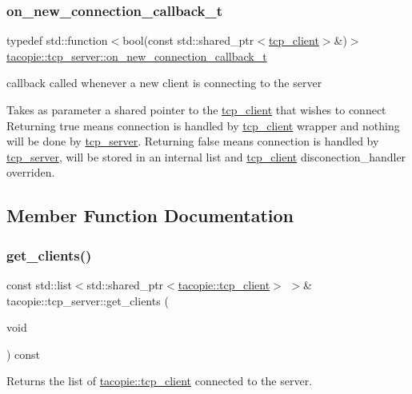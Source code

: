 \subsubsection{\texorpdfstring{on\+\_\+new\+\_\+connection\+\_\+callback\+\_\+t}{on\_new\_connection\_callback\_t}}
{\footnotesize\ttfamily typedef std\+::function$<$bool(const std\+::shared\+\_\+ptr$<$\hyperlink{classtacopie_1_1tcp__client}{tcp\+\_\+client}$>$\&)$>$ \hyperlink{classtacopie_1_1tcp__server_a103cb4e6fcab00f88a708aabd38b66ff}{tacopie\+::tcp\+\_\+server\+::on\+\_\+new\+\_\+connection\+\_\+callback\+\_\+t}}

callback called whenever a new client is connecting to the server

Takes as parameter a shared pointer to the \hyperlink{classtacopie_1_1tcp__client}{tcp\+\_\+client} that wishes to connect Returning true means connection is handled by \hyperlink{classtacopie_1_1tcp__client}{tcp\+\_\+client} wrapper and nothing will be done by \hyperlink{classtacopie_1_1tcp__server}{tcp\+\_\+server}. Returning false means connection is handled by \hyperlink{classtacopie_1_1tcp__server}{tcp\+\_\+server}, will be stored in an internal list and \hyperlink{classtacopie_1_1tcp__client}{tcp\+\_\+client} disconection\+\_\+handler overriden. 

\subsection{Member Function Documentation}
\mbox{\label{classtacopie_1_1tcp__server_a0df81b943243ad51102c37d4944be8d7}} 
\subsubsection{\texorpdfstring{get\+\_\+clients()}{get\_clients()}}
{\footnotesize\ttfamily const std\+::list$<$std\+::shared\+\_\+ptr$<$\hyperlink{classtacopie_1_1tcp__client}{tacopie\+::tcp\+\_\+client}$>$ $>$\& tacopie\+::tcp\+\_\+server\+::get\+\_\+clients (\begin{DoxyParamCaption}\item[{void}]{ }\end{DoxyParamCaption}) const}

\begin{DoxyReturn}{Returns}
the list of \hyperlink{classtacopie_1_1tcp__client}{tacopie\+::tcp\+\_\+client} connected to the server. 
\end{DoxyReturn}
\mbox{\label{classtacopie_1_1tcp__server_aace4796627b6abccccce1a541908414f}} 
